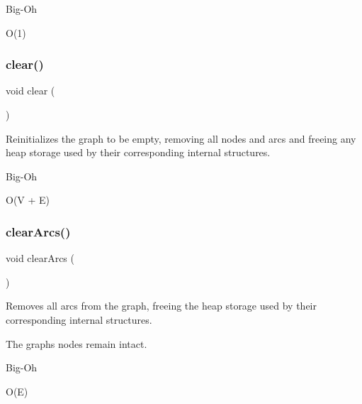 \begin{DoxyRefDesc}{Big-\/\+Oh}
\item[\mbox{\hyperlink{BigOh__BigOh000091}{Big-\/\+Oh}}]O(1) \end{DoxyRefDesc}
\mbox{\label{classGraph_ac8bb3912a3ce86b15842e79d0b421204}} 
\subsubsection{\texorpdfstring{clear()}{clear()}}
{\footnotesize\ttfamily void clear (\begin{DoxyParamCaption}{ }\end{DoxyParamCaption})\hspace{0.3cm}{\ttfamily [inherited]}}



Reinitializes the graph to be empty, removing all nodes and arcs and freeing any heap storage used by their corresponding internal structures. 

\begin{DoxyRefDesc}{Big-\/\+Oh}
\item[\mbox{\hyperlink{BigOh__BigOh000049}{Big-\/\+Oh}}]O(V + E) \end{DoxyRefDesc}
\mbox{\label{classGraph_a63f0ce1806df1c8070d997153363eecb}} 
\subsubsection{\texorpdfstring{clear\+Arcs()}{clearArcs()}\hspace{0.1cm}{\footnotesize\ttfamily [1/3]}}
{\footnotesize\ttfamily void clear\+Arcs (\begin{DoxyParamCaption}{ }\end{DoxyParamCaption})\hspace{0.3cm}{\ttfamily [inherited]}}



Removes all arcs from the graph, freeing the heap storage used by their corresponding internal structures. 

The graph\textquotesingle{}s nodes remain intact. \begin{DoxyRefDesc}{Big-\/\+Oh}
\item[\mbox{\hyperlink{BigOh__BigOh000050}{Big-\/\+Oh}}]O(\+E) \end{DoxyRefDesc}
\mbox{\label{classGraph_a14def9e68896088fec7839e5da4fed27}} 
